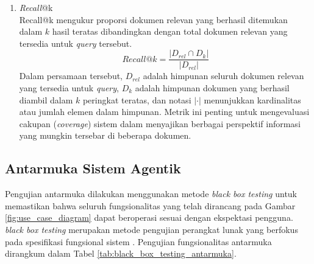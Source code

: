 \begin{enumerate}[noitemsep]
    Sehingga, nilai NDCG@k diperoleh melalui Persamaan \ref{eq:ndcg}:
    \begin{equation}
        NDCG@k = \frac{DCG@k}{IDCG@k}
        \label{eq:ndcg}
    \end{equation}
    \noindent
    Metrik ini digunakan untuk memastikan bahwa algoritma pengambilan tidak hanya menemukan dokumen yang benar, tetapi juga mampu mengurutkannya berdasarkan tingkat kepentingannya.

    \item \textit{Recall}@k \\
    Recall@k mengukur proporsi dokumen relevan yang berhasil ditemukan dalam $k$ hasil teratas dibandingkan dengan total dokumen relevan yang tersedia untuk \textit{query} tersebut.
    \begin{equation}
        Recall@k = \frac{|D_{rel} \cap D_{k}|}{|D_{rel}|}
        \label{eq:recall_at_k}
    \end{equation}
    \noindent
    Dalam persamaan tersebut, $D_{rel}$ adalah himpunan seluruh dokumen relevan yang tersedia untuk \textit{query}, $D_{k}$ adalah himpunan dokumen yang berhasil diambil dalam $k$ peringkat teratas, dan notasi $|\cdot|$ menunjukkan kardinalitas atau jumlah elemen dalam himpunan. Metrik ini penting untuk mengevaluasi cakupan (\textit{coverage}) sistem dalam menyajikan berbagai perspektif informasi yang mungkin tersebar di beberapa dokumen.
\end{enumerate}

\subsection{Antarmuka Sistem Agentik}
Pengujian antarmuka dilakukan menggunakan metode \textit{black box testing} untuk memastikan bahwa seluruh fungsionalitas yang telah dirancang pada Gambar \ref{fig:use_case_diagram} dapat beroperasi sesuai dengan ekspektasi pengguna. \textit{black box testing} merupakan metode pengujian perangkat lunak yang berfokus pada spesifikasi fungsional sistem \parencite{bhasinBlackBoxTesting2014}. Pengujian fungsionalitas antarmuka dirangkum dalam Tabel \ref{tab:black_box_testing_antarmuka}.

